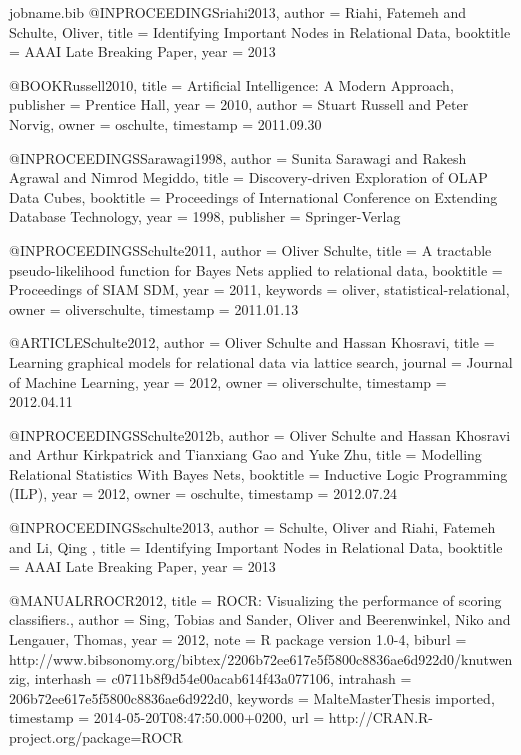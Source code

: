 {\begin{filecontents*}{jobname.bib}
	@INPROCEEDINGS{riahi2013,
		author = {Riahi, Fatemeh and Schulte, Oliver},
		title = {Identifying Important Nodes in Relational Data},
		booktitle = {AAAI Late Breaking Paper},
		year = {2013}
	}
	
	@BOOK{Russell2010,
		title = {Artificial Intelligence: A Modern Approach},
		publisher = {Prentice Hall},
		year = {2010},
		author = {Stuart Russell and Peter Norvig},
		owner = {oschulte},
		timestamp = {2011.09.30}
	}
	
	@INPROCEEDINGS{Sarawagi1998,
		author = {Sunita Sarawagi and Rakesh Agrawal and Nimrod Megiddo},
		title = {Discovery-driven Exploration of {OLAP} Data Cubes},
		booktitle = {Proceedings of International Conference on Extending Database Technology},
		year = {1998},
		publisher = {Springer-Verlag}
	}
	
	@INPROCEEDINGS{Schulte2011,
		author = {Oliver Schulte},
		title = {A tractable pseudo-likelihood function for {Bayes} Nets applied to
			relational data},
		booktitle = {Proceedings of SIAM SDM},
		year = {2011},
		keywords = {oliver, statistical-relational},
		owner = {oliverschulte},
		timestamp = {2011.01.13}
	}
	
	@ARTICLE{Schulte2012,
		author = {Oliver Schulte and Hassan Khosravi},
		title = {Learning graphical models for relational data via lattice search},
		journal = {Journal of Machine Learning},
		year = {2012},
		owner = {oliverschulte},
		timestamp = {2012.04.11}
	}
	
	@INPROCEEDINGS{Schulte2012b,
		author = {Oliver Schulte and Hassan Khosravi and Arthur Kirkpatrick and Tianxiang
			Gao and Yuke Zhu},
		title = {Modelling Relational Statistics With Bayes Nets},
		booktitle = {Inductive Logic Programming (ILP)},
		year = {2012},
		owner = {oschulte},
		timestamp = {2012.07.24}
	}
	
	@INPROCEEDINGS{schulte2013,
		author = {Schulte, Oliver and Riahi, Fatemeh and Li, Qing },
		title = {Identifying Important Nodes in Relational Data},
		booktitle = {AAAI Late Breaking Paper},
		year = {2013}
	}
	
	@MANUAL{RROCR2012,
		title = {ROCR: Visualizing the performance of scoring classifiers.},
		author = {Sing, Tobias and Sander, Oliver and Beerenwinkel, Niko and Lengauer,
			Thomas},
		year = {2012},
		note = {R package version 1.0-4},
		biburl = {http://www.bibsonomy.org/bibtex/2206b72ee617e5f5800c8836ae6d922d0/knutwenzig},
		interhash = {c0711b8f9d54e00acab614f43a077106},
		intrahash = {206b72ee617e5f5800c8836ae6d922d0},
		keywords = {MalteMasterThesis imported},
		timestamp = {2014-05-20T08:47:50.000+0200},
		url = {http://CRAN.R-project.org/package=ROCR}
	}
	

\end{filecontents*}}
